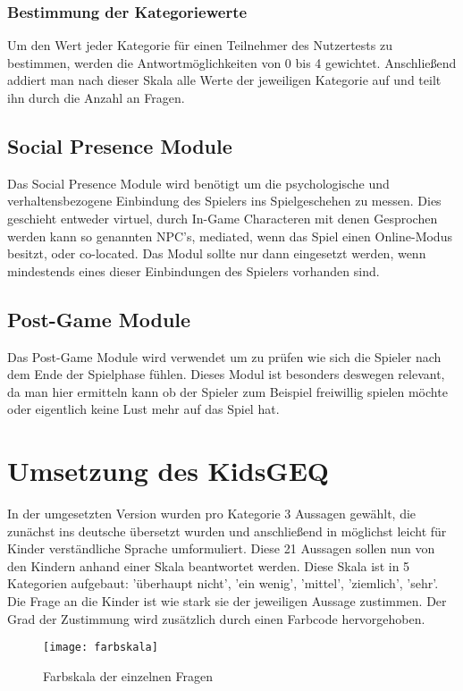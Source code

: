 \subsubsection{Bestimmung der Kategoriewerte}
Um den Wert jeder Kategorie für einen Teilnehmer des Nutzertests zu bestimmen, werden die Antwortmöglichkeiten von 0 bis 4 gewichtet. Anschließend addiert man nach dieser Skala alle Werte der jeweiligen Kategorie auf und teilt ihn durch die Anzahl an Fragen. 
\subsection{Social Presence Module} %
Das Social Presence Module wird benötigt um die psychologische und verhaltensbezogene Einbindung des Spielers ins Spielgeschehen zu messen. Dies geschieht entweder virtuel, durch In-Game Characteren mit denen Gesprochen werden kann so genannten NPC's, mediated, wenn das Spiel einen Online-Modus besitzt, oder co-located. Das Modul sollte nur dann eingesetzt werden, wenn mindestends eines dieser Einbindungen des Spielers vorhanden sind.
\subsection{Post-Game Module}
Das Post-Game Module wird verwendet um zu prüfen wie sich die Spieler nach dem Ende der Spielphase fühlen. Dieses Modul ist besonders deswegen relevant, da man hier ermitteln kann ob der Spieler zum Beispiel freiwillig spielen möchte oder eigentlich keine Lust mehr auf das Spiel hat.
\section{Umsetzung des KidsGEQ}
In der umgesetzten Version wurden pro Kategorie 3 Aussagen gewählt, die zunächst ins deutsche übersetzt wurden und anschließend in möglichst leicht für Kinder verständliche Sprache umformuliert. Diese 21 Aussagen sollen nun von den Kindern anhand einer Skala beantwortet werden. Diese Skala ist in 5 Kategorien aufgebaut: 'überhaupt nicht', 'ein wenig', 'mittel', 'ziemlich', 'sehr'. Die Frage an die Kinder ist wie stark sie der jeweiligen Aussage zustimmen. Der Grad der Zustimmung wird zusätzlich durch einen Farbcode hervorgehoben. 

\begin{figure}[htb]
	\centering
	\texttt{[image: farbskala]}
	\caption{Farbskala der einzelnen Fragen\label{fig:farbskala}}
\end{figure}

